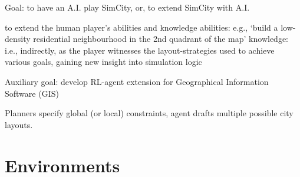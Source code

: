 \documentclass[xcolor=dvipsnames]{beamer}
\begin{document}
\begin{frame}
	Goal: to have an A.I. play SimCity, or, to extend SimCity with A.I.
	\begin{outline}
			\1 to extend the human player's abilities and knowledge
				\2 abilities: e.g., `build a low-density residential neighbourhood in the 2nd quadrant of the map'
				\2 knowledge: i.e., indirectly, as the player witnesses the layout-strategies used to achieve various goals, gaining new insight into simulation logic %
	\end{outline}
	Auxiliary goal: develop RL-agent extension for Geographical Information Software (GIS)
	\begin{outline}
		\1 Planners specify global (or local) constraints, agent drafts multiple possible city layouts. %
	\end{outline}
\end{frame}
\section{Environments}
\end{document}
